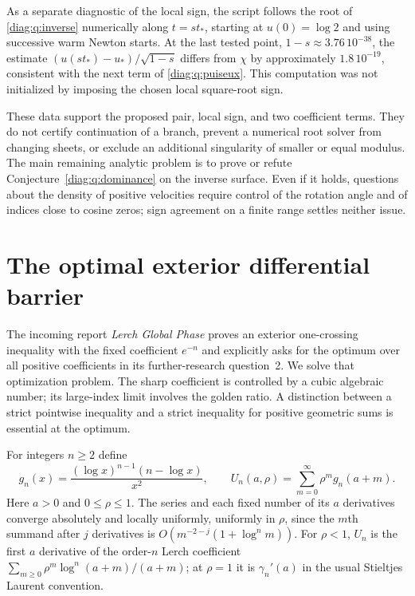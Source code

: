 \documentclass[11pt,a4paper]{article}
\theoremstyle{definition}
\theoremstyle{remark}
\numberwithin{equation}{section}
\begin{document}
As a separate diagnostic of the local sign, the script follows the root
of \eqref{diag:q:inverse} numerically along $t=s t_*$, starting at
$u(0)=\log2$ and using successive warm Newton starts.  At the last tested
point, $1-s\approx3.76\,10^{-38}$, the estimate
$(u(s t_*)-u_*)/\sqrt{1-s}$ differs from $\chi$ by approximately
$1.8\,10^{-19}$, consistent with the next term of
\eqref{diag:q:puiseux}.  This computation was not initialized by imposing
the chosen local square-root sign.

These data support the proposed pair, local sign, and two coefficient
terms.  They do not certify continuation of a branch, prevent a numerical
root solver from changing sheets, or exclude an additional singularity of
smaller or equal modulus.  The main remaining analytic problem is to
prove or refute Conjecture~\ref{diag:q:dominance} on the inverse surface.
Even if it holds, questions about the density of positive velocities
require control of the rotation angle and of indices close to cosine
zeros; sign agreement on a finite range settles neither issue.


\section{The optimal exterior differential barrier}
\label{opt:sec:barrier}

The incoming report \emph{Lerch Global Phase} proves an exterior
one-crossing inequality with the fixed coefficient $e^{-n}$ and explicitly
asks for the optimum over all positive coefficients in its further-research
question~2. We solve that optimization problem. The sharp coefficient is
controlled by a cubic algebraic number; its large-index limit involves the
golden ratio. A distinction between a strict pointwise inequality and a
strict inequality for positive geometric sums is essential at the optimum.

For integers $n\geq2$ define
\begin{equation}\label{opt:eq:family}
 g_n(x)=\frac{(\log x)^{n-1}(n-\log x)}{x^2},\qquad
 U_n(a,\rho)=\sum_{m=0}^{\infty}\rho^m g_n(a+m).
\end{equation}
Here $a>0$ and $0\leq\rho\leq1$. The series and each fixed number
of its $a$ derivatives converge absolutely and locally uniformly,
uniformly in $\rho$, since the $m$th summand after $j$ derivatives is
$O(m^{-2-j}(1+\log^n m))$. For $\rho<1$, $U_n$ is the first
$a$ derivative of the order-$n$ Lerch coefficient
$\sum_{m\geq0}\rho^m\log^n(a+m)/(a+m)$; at $\rho=1$ it is
$\gamma_n'(a)$ in the usual Stieltjes Laurent convention.
\end{document}
